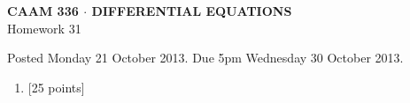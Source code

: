 \documentclass[10pt]{article}
\begin{document}
\vspace*{-5em}
\begin{center}
\large \textsf{\textbf{CAAM 336 $\cdot$ DIFFERENTIAL EQUATIONS}\\[0.5em]
Homework 31 }
\end{center}

Posted Monday 21 October 2013.  Due 5pm Wednesday 30 October 2013.

\begin{enumerate}\addtocounter{enumi}{30}
\item {[25 points]}  
\end{enumerate}
\end{document}
